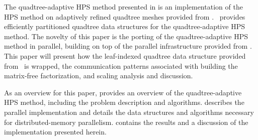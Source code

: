 The quadtree-adaptive HPS method presented in \cite{chipman2024fast} is an implementation of the HPS method on adaptively refined quadtree meshes provided from \pforest \cite{burstedde2011p4est,burstedde2020parallel}. \pforest\ provides efficiently partitioned quadtree data structures for the quadtree-adaptive HPS method. The novelty of this paper is the porting of the quadtree-adaptive HPS method in parallel, building on top of the parallel infrastructure provided from \pforest. This paper will present how the leaf-indexed quadtree data structure provided from \pforest\ is wrapped, the communication patterns associated with building the matrix-free factorization, and scaling analysis and discussion.


As an overview for this paper,  provides an overview of the quadtree-adaptive HPS method, including the problem description and algorithms.  describes the parallel implementation and details the data structures and algorithms necessary for distributed-memory parallelism.  contains the results and a discussion of the implementation presented herein.
